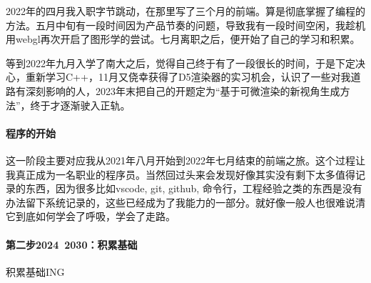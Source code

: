 2022年的四月我入职字节跳动，在那里写了三个月的前端。算是彻底掌握了编程的方法。五月中旬有一段时间因为产品节奏的问题，导致我有一段时间空闲，我趁机用webgl再次开启了图形学的尝试。七月离职之后，便开始了自己的学习和积累。

等到2022年九月入学了南大之后，觉得自己终于有了一段很长的时间，于是下定决心，重新学习C++，11月又侥幸获得了D5渲染器的实习机会，认识了一些对我道路有深刻影响的人，2023年末把自己的开题定为“基于可微渲染的新视角生成方法”，终于才逐渐驶入正轨。

\paragraph{程序的开始}
这一阶段主要对应我从2021年八月开始到2022年七月结束的前端之旅。这个过程让我真正成为一名职业的程序员。当然回过头来会发现好像其实没有剩下太多值得记录的东西，因为很多比如vscode, git, github, 命令行，工程经验之类的东西是没有办法留下系统记录的，这些已经成为了我能力的一部分。就好像一般人也很难说清它到底如何学会了呼吸，学会了走路。

\paragraph{第二步2024~2030：积累基础}

积累基础ING 